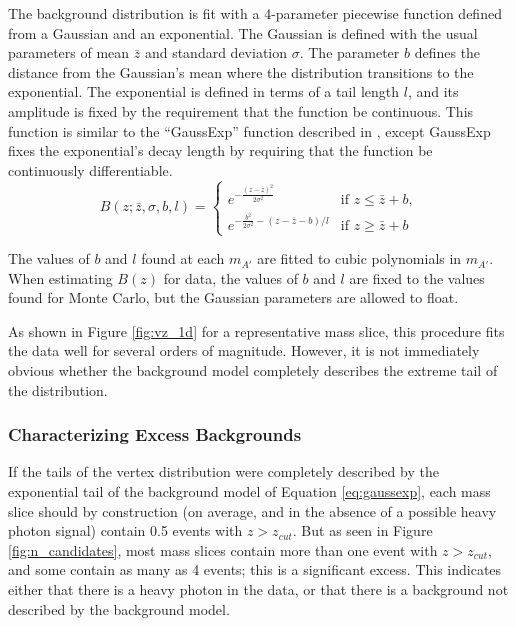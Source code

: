 The background distribution is fit with a 4-parameter piecewise function defined from a Gaussian and an exponential.
The Gaussian is defined with the usual parameters of mean $\bar{z}$ and standard deviation $\sigma$.
The parameter $b$ defines the distance from the Gaussian's mean where the distribution transitions to the exponential.
The exponential is defined in terms of a tail length $l$, and its amplitude is fixed by the requirement that the function be continuous.
This function is similar to the ``GaussExp'' function described in \cite{cms_collaboration_search_2015}, except GaussExp fixes the exponential's decay length by requiring that the function be continuously differentiable.
\begin{equation}
B(z;\bar{z},\sigma,b,l)=
\begin{cases}
e^{-\frac{(z-\bar{z})^2}{2\sigma^2}} &\text{if } z\le\bar{z}+b,\\
e^{-\frac{b^2}{2\sigma^2} - (z-\bar{z}-b)/l}  &\text{if } z\ge\bar{z}+b
\end{cases}
\label{eq:gaussexp}
\end{equation}

The values of $b$ and $l$ found at each $m_{A'}$ are fitted to cubic polynomials in $m_{A'}$.
When estimating $B(z)$ for data, the values of $b$ and $l$ are fixed to the values found for Monte Carlo, but the Gaussian parameters are allowed to float.

As shown in Figure \ref{fig:vz_1d} for a representative mass slice, this procedure fits the data well for several orders of magnitude.
However, it is not immediately obvious whether the background model completely describes the extreme tail of the distribution.

\subsubsection{Characterizing Excess Backgrounds}
\label{sec:excess_background}
If the tails of the vertex distribution were completely described by the exponential tail of the background model of Equation \ref{eq:gaussexp}, each mass slice should by construction (on average, and in the absence of a possible heavy photon signal) contain 0.5 events with $z>z_{cut}$.
But as seen in Figure \ref{fig:n_candidates}, most mass slices contain more than one event with $z>z_{cut}$, and some contain as many as 4 events; this is a significant excess.
This indicates either that there is a heavy photon in the data, or that there is a background not described by the background model.

